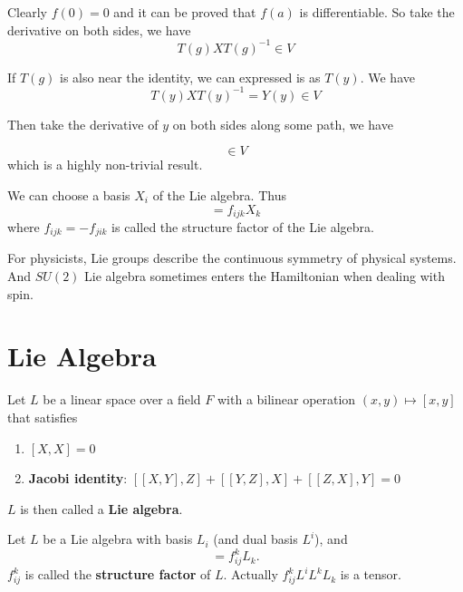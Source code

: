 \documentclass[12pt]{book}
\begin{document}
	Clearly $f(0)=0$ and it can be proved that $f(a)$ is differentiable. So take the derivative on both sides, we have
	\begin{equation}
		T(g)XT(g)^{-1}\in V
	\end{equation}
	
	If $T(g)$ is also near the identity, we can expressed is as $T(y)$. We have
	\begin{equation}
		T(y)XT(y)^{-1}=Y(y) \in V
	\end{equation}
	
	Then take the derivative of $y$ on both sides along some path, we have
	
	\begin{equation}
		[X,Y]\in V
	\end{equation}
	which is a highly non-trivial result.
	
	We can choose a basis $X_i$ of the Lie algebra. Thus
	\begin{equation}
		[X_i,X_j]=f_{ijk}X_k
	\end{equation}
	where $f_{ijk}=-f_{jik}$ is called the structure factor of the Lie algebra.
	
	For physicists, Lie groups describe the continuous symmetry of physical systems. And $SU(2)$ Lie algebra sometimes enters the Hamiltonian when dealing with spin.
	\section{Lie Algebra}
	
	\begin{definition}
		Let $L$ be a linear space over a field $F$ with a bilinear operation $(x,y)\mapsto [x,y]$ that satisfies
		\begin{enumerate}
			\item $[X,X]=0$
			\item{} {\bf Jacobi identity}: $[[X,Y],Z]+[[Y,Z],X]+[[Z,X],Y]=0$
		\end{enumerate}
		
		$L$ is then called a {\bf Lie algebra}.
	\end{definition}
	
	\begin{definition}
		Let $L$ be a Lie algebra with basis $L_i$ (and dual basis $L^i$), and 
		\begin{equation}
			[L_i,L_j]=f_{ij}^kL_k.
		\end{equation}
		$f_{ij}^k$ is called the {\bf structure factor} of $L$. Actually $f_{ij}^kL^iL^kL_k$ is a tensor. 
	\end{definition}
\end{document}
